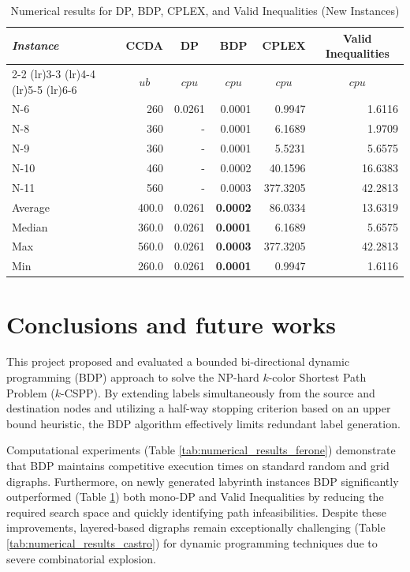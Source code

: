 \documentclass[pdflatex,sn-mathphys-num]{sn-jnl}
\begin{document}
\begin{table}[htbp]
\centering
\caption{Numerical results for DP, BDP, CPLEX, and Valid Inequalities (New Instances)}
\label{tab:numerical_results_new}
\begin{tabular*}{\textwidth}{l@{\extracolsep{\fill}}rrrrr}
\toprule
\textit{Instance} & \multicolumn{1}{c}{CCDA} & \multicolumn{1}{c}{DP} & \multicolumn{1}{c}{BDP} & \multicolumn{1}{c}{CPLEX} & \multicolumn{1}{c}{Valid Inequalities} \\
\cmidrule(lr){2-2} \cmidrule(lr){3-3} \cmidrule(lr){4-4} \cmidrule(lr){5-5} \cmidrule(lr){6-6}
 & \multicolumn{1}{c}{$ub$} & \multicolumn{1}{c}{$cpu$} & \multicolumn{1}{c}{$cpu$} & \multicolumn{1}{c}{$cpu$} & \multicolumn{1}{c}{$cpu$} \\
\midrule
N-6  & 260 & 0.0261 & 0.0001 & 0.9947 & 1.6116 \\
N-8  & 360 & - & 0.0001 & 6.1689 & 1.9709 \\
N-9  & 360 & - & 0.0001 & 5.5231 & 5.6575 \\
N-10 & 460 & - & 0.0002 & 40.1596 & 16.6383 \\
N-11 & 560 & - & 0.0003 & 377.3205 & 42.2813 \\
\midrule
Average & 400.0 & 0.0261 & \textbf{0.0002} & 86.0334 & 13.6319 \\
Median  & 360.0 & 0.0261 & \textbf{0.0001} & 6.1689 & 5.6575 \\
Max     & 560.0 & 0.0261 & \textbf{0.0003} & 377.3205 & 42.2813 \\
Min     & 260.0 & 0.0261 & \textbf{0.0001} & 0.9947 & 1.6116 \\
\bottomrule
\end{tabular*}
\end{table}

\section{Conclusions and future works}
This project proposed and evaluated a bounded bi-directional dynamic programming (BDP) \cite{righini2006} approach to solve the NP-hard $k$-color Shortest Path Problem ($k$-CSPP). 
By extending labels simultaneously from the source and destination nodes and utilizing a half-way stopping criterion based on an upper bound heuristic, the BDP algorithm effectively limits redundant label generation. 

Computational experiments (Table \ref{tab:numerical_results_ferone}) demonstrate that BDP maintains competitive execution times on standard random and grid digraphs. 
Furthermore, on newly generated labyrinth instances BDP significantly outperformed (Table \ref{tab:numerical_results_new}) both mono-DP and Valid Inequalities by reducing 
the required search space and quickly identifying path infeasibilities.  
Despite these improvements, layered-based digraphs remain exceptionally challenging (Table \ref{tab:numerical_results_castro}) for dynamic programming techniques due to severe combinatorial explosion. 
\end{document}
